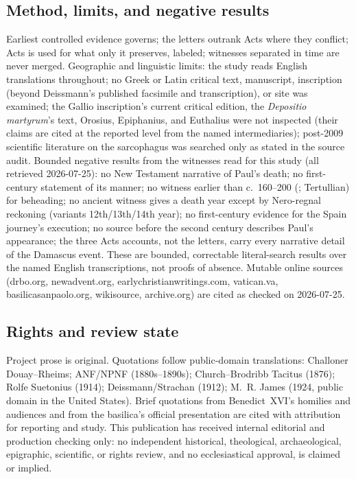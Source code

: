 \subsection{Method, limits, and negative results}

Earliest controlled evidence governs; the letters outrank Acts where they
conflict; Acts is used for what only it preserves, labeled; witnesses
separated in time are never merged. Geographic and linguistic limits: the
study reads English translations throughout; no Greek or Latin critical
text, manuscript, inscription (beyond Deissmann's published facsimile and
transcription), or site was examined; the Gallio inscription's current
critical edition, the \textit{Depositio martyrum}'s text, Orosius,
Epiphanius, and Euthalius were not inspected (their claims are cited at
the reported level from the named intermediaries); post-2009 scientific
literature on the sarcophagus was searched only as stated in the source
audit. Bounded negative results from the witnesses read for this study
(all retrieved 2026-07-25): no New Testament narrative of Paul's death;
no first-century statement of its manner; no witness earlier than
c.~160--200 (; Tertullian) for beheading; no ancient
witness gives a death year except by Nero-regnal reckoning (variants
12th/13th/14th year); no first-century evidence for the Spain journey's
execution; no source before the second century describes Paul's
appearance; the three Acts accounts, not the letters, carry every
narrative detail of the Damascus event. These are bounded, correctable
literal-search results over the named English transcriptions, not proofs
of absence. Mutable online sources (drbo.org, newadvent.org,
earlychristianwritings.com, vatican.va, basilicasanpaolo.org, wikisource,
archive.org) are cited as checked on 2026-07-25.

\subsection{Rights and review state}

Project prose is original. Quotations follow public-domain translations:
Challoner Douay--Rheims; ANF/NPNF (1880s--1890s); Church--Brodribb
Tacitus (1876); Rolfe Suetonius (1914); Deissmann/Strachan (1912); M.~R.
James (1924, public domain in the United States). Brief quotations from
Benedict~XVI's homilies and audiences and from the basilica's official
presentation are cited with attribution for reporting and study. This
publication has received internal editorial and production checking only:
no independent historical, theological, archaeological, epigraphic,
scientific, or rights review, and no ecclesiastical approval, is claimed
or implied.
